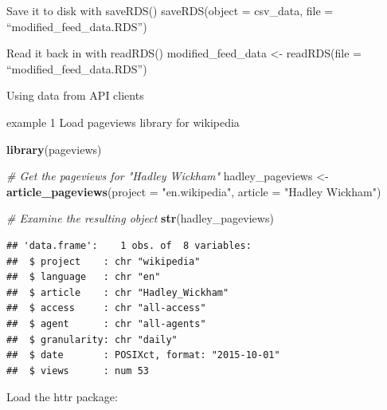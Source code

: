 \documentclass[]{book}
\newenvironment{Shaded}{\begin{snugshade}}{\end{snugshade}}
\newcommand{\CommentTok}[1]{\textcolor[rgb]{0.56,0.35,0.01}{\textit{#1}}}
\newcommand{\DataTypeTok}[1]{\textcolor[rgb]{0.13,0.29,0.53}{#1}}
\newcommand{\DecValTok}[1]{\textcolor[rgb]{0.00,0.00,0.81}{#1}}
\newcommand{\KeywordTok}[1]{\textcolor[rgb]{0.13,0.29,0.53}{\textbf{#1}}}
\newcommand{\NormalTok}[1]{#1}
\newcommand{\OperatorTok}[1]{\textcolor[rgb]{0.81,0.36,0.00}{\textbf{#1}}}
\newcommand{\StringTok}[1]{\textcolor[rgb]{0.31,0.60,0.02}{#1}}
\begin{document}
\begin{Shaded}
\end{Shaded}

Save it to disk with saveRDS()
saveRDS(object = csv\_data, file = ``modified\_feed\_data.RDS'')

Read it back in with readRDS()
modified\_feed\_data \textless{}- readRDS(file = ``modified\_feed\_data.RDS'')

Using data from API clients

example 1
Load pageviews library for wikipedia

\begin{Shaded}
\begin{Highlighting}[]
\KeywordTok{library}\NormalTok{(pageviews)}

\CommentTok{# Get the pageviews for "Hadley Wickham"}
\NormalTok{hadley_pageviews <-}\StringTok{ }\KeywordTok{article_pageviews}\NormalTok{(}\DataTypeTok{project =} \StringTok{"en.wikipedia"}\NormalTok{, }\DataTypeTok{article =} \StringTok{"Hadley Wickham"}\NormalTok{)}

\CommentTok{# Examine the resulting object}
\KeywordTok{str}\NormalTok{(hadley_pageviews)}
\end{Highlighting}
\end{Shaded}

\begin{verbatim}
## 'data.frame':	1 obs. of  8 variables:
##  $ project    : chr "wikipedia"
##  $ language   : chr "en"
##  $ article    : chr "Hadley_Wickham"
##  $ access     : chr "all-access"
##  $ agent      : chr "all-agents"
##  $ granularity: chr "daily"
##  $ date       : POSIXct, format: "2015-10-01"
##  $ views      : num 53
\end{verbatim}

Load the httr package:
\end{document}
